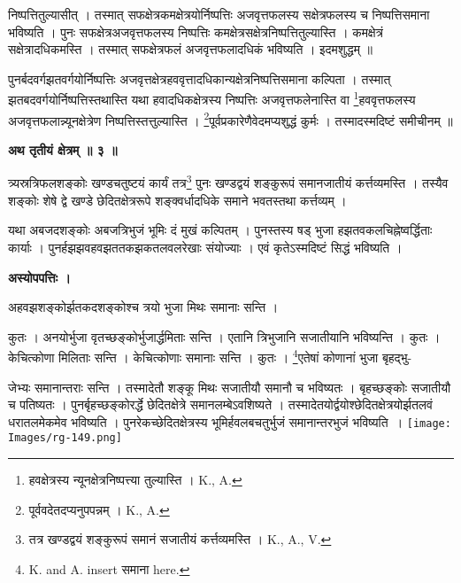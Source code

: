 \documentclass[11pt, openany]{book}
\begin{document}
\newpage
\noindent निष्पत्तितुल्यासीत् । तस्मात् सफक्षेत्रकमक्षेत्रयोर्निष्पत्तिः अजवृत्तफलस्य सक्षेत्रफलस्य च निष्पत्तिसमाना भविष्यति । पुनः सफक्षेत्रअजवृत्तफलस्य निष्पत्तिः कमक्षेत्रसक्षेत्रनिष्पत्तितुल्यास्ति ।
कमक्षेत्रं सक्षेत्रादधिकमस्ति । तस्मात् सफक्षेत्रफलं अजवृत्तफलादधिकं भविष्यति । इदमशुद्धम् ॥\\
\vspace{5mm}

पुनर्बदवर्गझतवर्गयोर्निष्पत्तिः अजवृत्तक्षेत्रहववृत्तादधिकान्यक्षेत्रनिष्पत्तिसमाना कल्पिता । तस्मात्
झतबदवर्गयोर्निष्पत्तिस्तथास्ति यथा हवादधिकक्षेत्रस्य निष्पत्तिः अजवृत्तफलेनास्ति वा
\renewcommand{\thefootnote}{१}\footnote{हवक्षेत्रस्य न्यूनक्षेत्रनिष्पत्त्या तुल्यास्ति । {\en K., A.} }हववृत्तफलस्य
अजवृत्तफलान्न्यूनक्षेत्रेण निष्पत्तिस्तत्तुल्यास्ति ।
\renewcommand{\thefootnote}{२}\footnote{पूर्ववदेतदप्यनुपपन्नम् । {\en K., A.} }पूर्वप्रकारेणैवेदमप्यशुद्धं कुर्मः । तस्मादस्मदिष्टं समीचीनम् ॥\\
\vspace{5mm}

\begin{center}
\textbf{\large अथ तृतीयं क्षेत्रम् ॥ ३ ॥}
\end{center}
\vspace{5mm}

{\ab त्र्यस्रत्रिफलशङ्कोः खण्डचतुष्टयं कार्यं तत्र\renewcommand{\thefootnote}{३}\footnote{तत्र खण्डद्वयं शङ्कुरूपं समानं सजातीयं कर्त्तव्यमस्ति । {\en K., A., V.}} पुनः खण्डद्वयं
शङ्कुरूपं समानजातीयं कर्त्तव्यमस्ति । तस्यैव शङ्कोः शेषे द्वे
खण्डे छेदितक्षेत्ररूपे शङ्क्वर्धादधिके समाने भवतस्तथा कर्त्तव्यम् ।}\\
\vspace{5mm}


यथा अबजदशङ्कोः अबजत्रिभुजं भूमिः दं मुखं कल्पितम् । पुनस्तस्य षड् भुजा हझतवकलचिह्नेष्वर्द्धिताः कार्याः । पुनर्हझझवहवझततकझकतलवलरेखाः संयोज्याः । एवं कृतेऽस्मदिष्टं सिद्धं भविष्यति ।\\
\vspace{3mm}

\begin{center}
\textbf{\large अस्योपपत्तिः ।}
\end{center}
\vspace{3mm}

 अहवझशङ्कोर्झतकदशङ्कोश्च त्रयो भुजा मिथः समानाः सन्ति ।

\newpage
\noindent कुतः । अनयोर्भुजा वृतच्छङ्कोर्भुजार्द्धमिताः सन्ति । एतानि त्रिभुजानि सजातीयानि भविष्यन्ति । कुतः । केचित्कोणा मिलिताः सन्ति । केचित्कोणाः समानाः सन्ति । कुतः । \renewcommand{\thefootnote}{१}\footnote{{\en K. and A. insert} समाना {\en here.}}एतेषां कोणानां भुजा बृहद्भु-
\begin{vwcol}[widths={0.65,0.35}, sep=.8cm, rule=0pt]
जेभ्यः समानान्तराः सन्ति । तस्मादेतौ शङ्कू मिथः सजातीयौ समानौ च भविष्यतः । बृहच्छङ्कोः सजातीयौ च पतिष्यतः । पुनर्बृहच्छङ्कोरर्द्धे छेदितक्षेत्रे समानलम्बेऽवशिष्यते । तस्मादेतयोर्द्वयोश्छेदितक्षेत्रयोर्झतलवं धरातलमेकमेव भविष्यति । पुनरेकच्छेदितक्षेत्रस्य भूमिर्हवलबचतुर्भुजं समानान्तरभुजं भविष्यति~। 
\noindent \texttt{[image: Images/rg-149.png]}  
\end{vwcol}
\vspace{-3mm}
\end{document}
